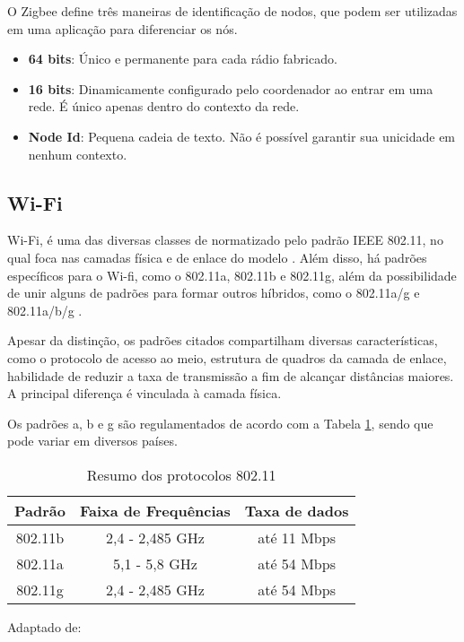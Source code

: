 O Zigbee define três maneiras de identificação de nodos, que podem ser utilizadas em uma aplicação para diferenciar os nós.

\begin{itemize} \parskip -4pt
	\item \textbf{64 bits}: Único e permanente para cada rádio fabricado.
	\item \textbf{16 bits}: Dinamicamente configurado pelo coordenador ao entrar em uma rede. É único apenas 
	dentro do contexto da rede.
	\item \textbf{Node Id}: Pequena cadeia de texto. Não é possível garantir sua unicidade em nenhum contexto.
\end{itemize}

\subsection{Wi-Fi}
Wi-Fi, é uma das diversas classes de  normatizado pelo padrão IEEE 802.11, no qual foca nas camadas física e de enlace do modelo  \cite{Gast2005}. 
Além disso, há padrões específicos para o Wi-fi, como o 802.11a, 802.11b e 802.11g,  além da possibilidade de unir alguns de padrões para formar outros híbridos, como o 802.11a/g e 802.11a/b/g \cite{Kurose2012}. 

Apesar da distinção, os padrões citados compartilham diversas características, como o protocolo de acesso ao meio, estrutura de quadros da camada de enlace, habilidade de reduzir a taxa de transmissão a fim de alcançar distâncias maiores. A principal diferença é vinculada à camada física.

Os padrões a, b e g são regulamentados de acordo com a Tabela \ref{tab:ieee80211abg-phy}, sendo que pode variar em diversos países.

\begin{table}[hbt]
    \caption{Resumo dos protocolos 802.11}
    \label{tab:ieee80211abg-phy}
    \centering
    \begin{tabular}{@{}ccc@{}}
        \toprule
        \textbf{Padrão} & \textbf{Faixa de Frequências} & \textbf{Taxa de dados} \\ \midrule
        802.11b         & 2,4 - 2,485 GHz               & até 11 Mbps            \\
        802.11a         & 5,1 - 5,8 GHz                 & até 54 Mbps            \\
        802.11g         & 2,4 - 2,485 GHz               & até 54 Mbps            \\ \bottomrule 
        \end{tabular}
        
    Adaptado de: 
\end{table}


